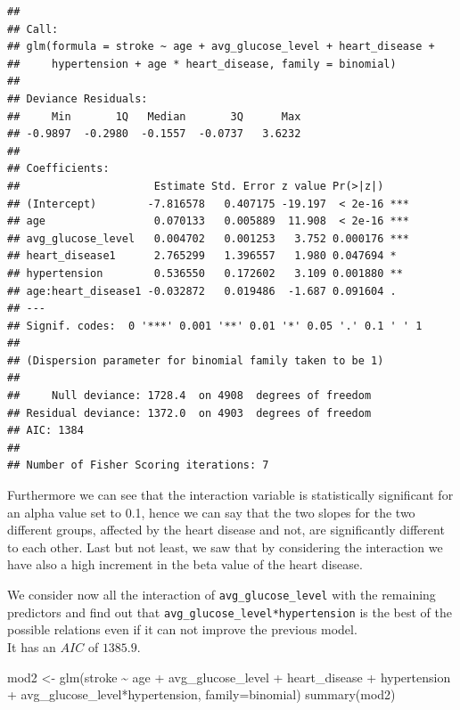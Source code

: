\documentclass[
]{article}
\newenvironment{Shaded}{\begin{snugshade}}{\end{snugshade}}
\newcommand{\AttributeTok}[1]{\textcolor[rgb]{0.77,0.63,0.00}{#1}}
\newcommand{\FunctionTok}[1]{\textcolor[rgb]{0.00,0.00,0.00}{#1}}
\newcommand{\NormalTok}[1]{#1}
\newcommand{\OtherTok}[1]{\textcolor[rgb]{0.56,0.35,0.01}{#1}}
\newcommand{\SpecialCharTok}[1]{\textcolor[rgb]{0.00,0.00,0.00}{#1}}
\begin{document}
\begin{verbatim}
## 
## Call:
## glm(formula = stroke ~ age + avg_glucose_level + heart_disease + 
##     hypertension + age * heart_disease, family = binomial)
## 
## Deviance Residuals: 
##     Min       1Q   Median       3Q      Max  
## -0.9897  -0.2980  -0.1557  -0.0737   3.6232  
## 
## Coefficients:
##                     Estimate Std. Error z value Pr(>|z|)    
## (Intercept)        -7.816578   0.407175 -19.197  < 2e-16 ***
## age                 0.070133   0.005889  11.908  < 2e-16 ***
## avg_glucose_level   0.004702   0.001253   3.752 0.000176 ***
## heart_disease1      2.765299   1.396557   1.980 0.047694 *  
## hypertension        0.536550   0.172602   3.109 0.001880 ** 
## age:heart_disease1 -0.032872   0.019486  -1.687 0.091604 .  
## ---
## Signif. codes:  0 '***' 0.001 '**' 0.01 '*' 0.05 '.' 0.1 ' ' 1
## 
## (Dispersion parameter for binomial family taken to be 1)
## 
##     Null deviance: 1728.4  on 4908  degrees of freedom
## Residual deviance: 1372.0  on 4903  degrees of freedom
## AIC: 1384
## 
## Number of Fisher Scoring iterations: 7
\end{verbatim}

Furthermore we can see that the interaction variable is statistically
significant for an alpha value set to 0.1, hence we can say that the two
slopes for the two different groups, affected by the heart disease and
not, are significantly different to each other. Last but not least, we
saw that by considering the interaction we have also a high increment in
the beta value of the heart disease.

We consider now all the interaction of \texttt{avg\_glucose\_level} with
the remaining predictors and find out that
\texttt{avg\_glucose\_level*hypertension} is the best of the possible
relations even if it can not improve the previous model.\\
It has an \(AIC\) of \(1385.9\).

\begin{Shaded}
\begin{Highlighting}[]
\NormalTok{mod2 }\OtherTok{\textless{}{-}} \FunctionTok{glm}\NormalTok{(stroke }\SpecialCharTok{\textasciitilde{}}\NormalTok{ age }\SpecialCharTok{+}\NormalTok{ avg\_glucose\_level }\SpecialCharTok{+}\NormalTok{ heart\_disease }\SpecialCharTok{+}\NormalTok{ hypertension }\SpecialCharTok{+}
\NormalTok{              avg\_glucose\_level}\SpecialCharTok{*}\NormalTok{hypertension, }\AttributeTok{family=}\NormalTok{binomial)}
\FunctionTok{summary}\NormalTok{(mod2)}
\end{Highlighting}
\end{Shaded}
\end{document}
